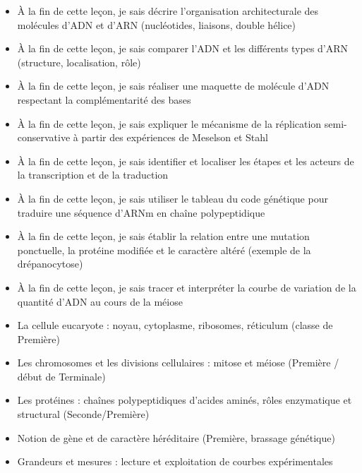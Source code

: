 \documentclass[11pt]{article}
\begin{document}
\begin{objectifs}
\begin{itemize}
\item À la fin de cette leçon, je sais décrire l'organisation architecturale des molécules d'ADN et d'ARN (nucléotides, liaisons, double hélice)
\item À la fin de cette leçon, je sais comparer l'ADN et les différents types d'ARN (structure, localisation, rôle)
\item À la fin de cette leçon, je sais réaliser une maquette de molécule d'ADN respectant la complémentarité des bases
\item À la fin de cette leçon, je sais expliquer le mécanisme de la réplication semi-conservative à partir des expériences de Meselson et Stahl
\item À la fin de cette leçon, je sais identifier et localiser les étapes et les acteurs de la transcription et de la traduction
\item À la fin de cette leçon, je sais utiliser le tableau du code génétique pour traduire une séquence d'ARNm en chaîne polypeptidique
\item À la fin de cette leçon, je sais établir la relation entre une mutation ponctuelle, la protéine modifiée et le caractère altéré (exemple de la drépanocytose)
\item À la fin de cette leçon, je sais tracer et interpréter la courbe de variation de la quantité d'ADN au cours de la méiose
\end{itemize}
\end{objectifs}

\begin{prerequis}
\begin{itemize}
\item La cellule eucaryote : noyau, cytoplasme, ribosomes, réticulum (classe de Première)
\item Les chromosomes et les divisions cellulaires : mitose et méiose (Première / début de Terminale)
\item Les protéines : chaînes polypeptidiques d'acides aminés, rôles enzymatique et structural (Seconde/Première)
\item Notion de gène et de caractère héréditaire (Première, brassage génétique)
\item Grandeurs et mesures : lecture et exploitation de courbes expérimentales
\end{itemize}
\end{prerequis}

\newpage
\end{document}
